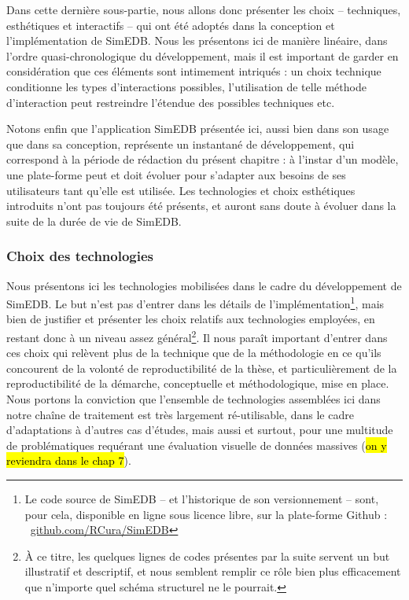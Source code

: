 Dans cette dernière sous-partie, nous allons donc présenter les choix -- techniques, esthétiques et interactifs -- qui ont été adoptés dans la conception et l'implémentation de SimEDB.
Nous les présentons ici de manière linéaire, dans l'ordre quasi-chronologique du développement, mais il est important de garder en considération que ces éléments sont intimement intriqués : un choix technique conditionne les types d'interactions possibles, l'utilisation de telle méthode d'interaction peut restreindre l'étendue des possibles techniques etc.

Notons enfin que l'application SimEDB présentée ici, aussi bien dans son usage que dans sa conception, représente un instantané de développement, qui correspond à la période de rédaction du présent chapitre :
à l'instar d'un modèle, une plate-forme peut et doit évoluer pour s'adapter aux besoins de ses utilisateurs tant qu'elle est utilisée.
Les technologies et choix esthétiques introduits n'ont pas toujours été présents, et auront sans doute à évoluer dans la suite de la \og durée de vie\fg{} de SimEDB.

\subsubsection{Choix des technologies}

Nous présentons ici les technologies mobilisées dans le cadre du développement de SimEDB.
Le but n'est pas d'entrer dans les détails de l'implémentation\footnote{
Le code source de SimEDB -- et l'historique de son versionnement -- sont, pour cela, disponible en ligne sous licence libre, sur la plate-forme Github : 
\faGithub~\href{https://github.com/RCura/SimEDB}{github.com/RCura/SimEDB}
}, mais bien de justifier et présenter les choix relatifs aux technologies employées, en restant donc à un niveau assez général\footnote{
À ce titre, les quelques lignes de codes présentes par la suite servent un but illustratif et descriptif, et nous semblent remplir ce rôle bien plus efficacement que n'importe quel schéma structurel ne le pourrait.
}.
Il nous paraît important d'entrer dans ces choix qui relèvent plus de la technique que de la méthodologie en ce qu'ils concourent de la volonté de reproductibilité de la thèse, et particulièrement de la reproductibilité de la démarche, conceptuelle et méthodologique, mise en place.
Nous portons la conviction que l'ensemble de technologies assemblées ici dans notre \og chaîne de traitement\fg{} est très largement ré-utilisable, dans le cadre d'adaptations à d'autres cas d'études, mais aussi et surtout, pour une multitude de problématiques requérant une évaluation visuelle de données massives (\hl{on y reviendra dans le chap 7}).

